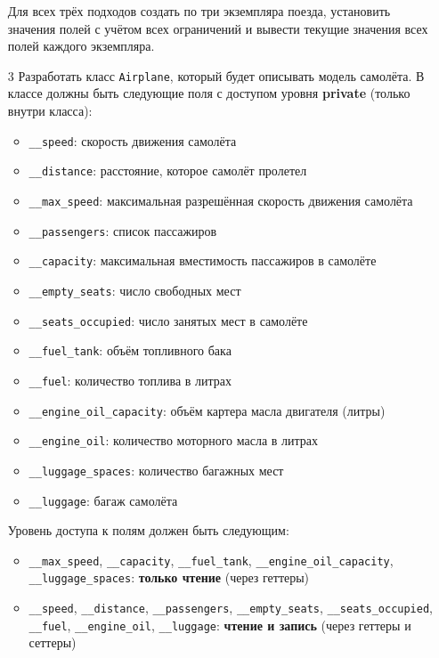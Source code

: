 \begin{enumerate}
\begin{enumerate}
\end{enumerate}
Для всех трёх подходов создать по три экземпляра поезда, установить значения полей с учётом всех ограничений и вывести текущие значения всех полей каждого экземпляра.
\item[3] Разработать класс \texttt{Airplane}, который будет описывать модель самолёта. В классе должны быть следующие поля с доступом уровня \textbf{private} (только внутри класса):
\begin{itemize}
    \item \texttt{\_\_speed}: скорость движения самолёта  
    \item \texttt{\_\_distance}: расстояние, которое самолёт пролетел  
    \item \texttt{\_\_max\_speed}: максимальная разрешённая скорость движения самолёта  
    \item \texttt{\_\_passengers}: список пассажиров  
    \item \texttt{\_\_capacity}: максимальная вместимость пассажиров в самолёте  
    \item \texttt{\_\_empty\_seats}: число свободных мест  
    \item \texttt{\_\_seats\_occupied}: число занятых мест в самолёте  
    \item \texttt{\_\_fuel\_tank}: объём топливного бака  
    \item \texttt{\_\_fuel}: количество топлива в литрах  
    \item \texttt{\_\_engine\_oil\_capacity}: объём картера масла двигателя (литры)  
    \item \texttt{\_\_engine\_oil}: количество моторного масла в литрах  
    \item \texttt{\_\_luggage\_spaces}: количество багажных мест  
    \item \texttt{\_\_luggage}: багаж самолёта  
\end{itemize}
Уровень доступа к полям должен быть следующим:
\begin{itemize}
    \item \texttt{\_\_max\_speed}, \texttt{\_\_capacity}, \texttt{\_\_fuel\_tank}, \texttt{\_\_engine\_oil\_capacity}, \texttt{\_\_luggage\_spaces}: \textbf{только чтение} (через геттеры)  
    \item \texttt{\_\_speed}, \texttt{\_\_distance}, \texttt{\_\_passengers}, \texttt{\_\_empty\_seats}, \texttt{\_\_seats\_occupied}, \texttt{\_\_fuel}, \texttt{\_\_engine\_oil}, \texttt{\_\_luggage}: \textbf{чтение и запись} (через геттеры и сеттеры)
\end{itemize}

\end{enumerate}
